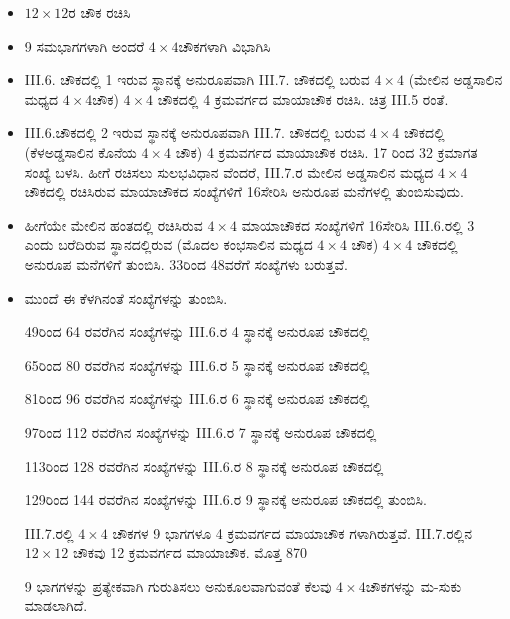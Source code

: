 \begin{itemize}
	\item $12 \times 12$ರ ಚೌಕ ರಚಿಸಿ
	\item 9 ಸಮಭಾಗಗಳಾಗಿ ಅಂದರೆ $4 \times 4$ಚೌಕಗಳಾಗಿ ವಿಭಾಗಿಸಿ
	\item  III.6. ಚೌಕದಲ್ಲಿ 1 ಇರುವ ಸ್ಥಾನಕ್ಕೆ ಅನುರೂಪವಾಗಿ  III.7. ಚೌಕದಲ್ಲಿ ಬರುವ $4 \times 4$ (ಮೇಲಿನ ಅಡ್ಡಸಾಲಿನ ಮಧ್ಯದ $4 \times 4$ಚೌಕ) $4 \times 4$ ಚೌಕದಲ್ಲಿ 4 ಕ್ರಮವರ್ಗದ ಮಾಯಾಚೌಕ ರಚಿಸಿ. ಚಿತ್ರ  III.5 ರಂತೆ.
	\item  III.6.ಚೌಕದಲ್ಲಿ 2 ಇರುವ ಸ್ಥಾನಕ್ಕೆ ಅನುರೂಪವಾಗಿ  III.7. ಚೌಕದಲ್ಲಿ ಬರುವ $4 \times 4$ ಚೌಕದಲ್ಲಿ (ಕೆಳಅಡ್ಡಸಾಲಿನ ಕೊನೆಯ $4 \times 4$ ಚೌಕ) 4 ಕ್ರಮವರ್ಗದ ಮಾಯಾಚೌಕ 
	ರಚಿಸಿ. 17 ರಿಂದ 32 ಕ್ರಮಾಗತ ಸಂಖ್ಯೆ ಬಳಸಿ. ಹೀಗೆ ರಚಿಸಲು ಸುಲಭವಿಧಾನ ವೆಂದರೆ,  III.7.ರ ಮೇಲಿನ ಅಡ್ಡಸಾಲಿನ ಮಧ್ಯದ $4 \times 4$ ಚೌಕದಲ್ಲಿ ರಚಿಸಿರುವ ಮಾಯಾಚೌಕದ ಸಂಖ್ಯೆಗಳಿಗೆ 16ಸೇರಿಸಿ ಅನುರೂಪ ಮನೆಗಳಲ್ಲಿ ತುಂಬಿಸುವುದು.
	\item ಹೀಗೆಯೇ ಮೇಲಿನ ಹಂತದಲ್ಲಿ ರಚಿಸಿರುವ $4 \times 4$ ಮಾಯಾಚೌಕದ ಸಂಖ್ಯೆಗಳಿಗೆ 16ಸೇರಿಸಿ  III.6.ರಲ್ಲಿ 3 ಎಂದು ಬರೆದಿರುವ ಸ್ಥಾನದಲ್ಲಿರುವ (ಮೊದಲ ಕಂಭಸಾಲಿನ ಮಧ್ಯದ $4 \times 4$ ಚೌಕ) $4 \times 4$ ಚೌಕದಲ್ಲಿ ಅನುರೂಪ ಮನೆಗಳಿಗೆ ತುಂಬಿಸಿ. 33ರಿಂದ 48ವರೆಗೆ ಸಂಖ್ಯೆಗಳು ಬರುತ್ತವೆ.
	\item ಮುಂದೆ ಈ ಕೆಳಗಿನಂತೆ ಸಂಖ್ಯೆಗಳನ್ನು ತುಂಬಿಸಿ.

	49ರಿಂದ 64 ರವರೆಗಿನ ಸಂಖ್ಯೆಗಳನ್ನು  III.6.ರ 4 ಸ್ಥಾನಕ್ಕೆ ಅನುರೂಪ ಚೌಕದಲ್ಲಿ

	65ರಿಂದ 80 ರವರೆಗಿನ ಸಂಖ್ಯೆಗಳನ್ನು  III.6.ರ 5 ಸ್ಥಾನಕ್ಕೆ ಅನುರೂಪ ಚೌಕದಲ್ಲಿ

	81ರಿಂದ 96 ರವರೆಗಿನ ಸಂಖ್ಯೆಗಳನ್ನು  III.6.ರ 6 ಸ್ಥಾನಕ್ಕೆ ಅನುರೂಪ ಚೌಕದಲ್ಲಿ

	97ರಿಂದ 112 ರವರೆಗಿನ ಸಂಖ್ಯೆಗಳನ್ನು  III.6.ರ 7 ಸ್ಥಾನಕ್ಕೆ ಅನುರೂಪ ಚೌಕದಲ್ಲಿ

	113ರಿಂದ 128 ರವರೆಗಿನ ಸಂಖ್ಯೆಗಳನ್ನು  III.6.ರ 8 ಸ್ಥಾನಕ್ಕೆ ಅನುರೂಪ ಚೌಕದಲ್ಲಿ

	129ರಿಂದ 144 ರವರೆಗಿನ ಸಂಖ್ಯೆಗಳನ್ನು  III.6.ರ 9 ಸ್ಥಾನಕ್ಕೆ ಅನುರೂಪ ಚೌಕದಲ್ಲಿ ತುಂಬಿಸಿ.

	III.7.ರಲ್ಲಿ $4 \times 4$ ಚೌಕಗಳ 9 ಭಾಗಗಳೂ 4 ಕ್ರಮವರ್ಗದ ಮಾಯಾಚೌಕ ಗಳಾಗಿರುತ್ತವೆ.  III.7.ರಲ್ಲಿನ $12 \times 12$ ಚೌಕವು 12 ಕ್ರಮವರ್ಗದ ಮಾಯಾಚೌಕ. ಮೊತ್ತ 870

	9 ಭಾಗಗಳನ್ನು ಪ್ರತ್ಯೇಕವಾಗಿ ಗುರುತಿಸಲು ಅನುಕೂಲವಾಗುವಂತೆ ಕೆಲವು $4 \times 4$ಚೌಕಗಳನ್ನು ಮ-ಸುಕು ಮಾಡಲಾಗಿದೆ.
\end{itemize}

